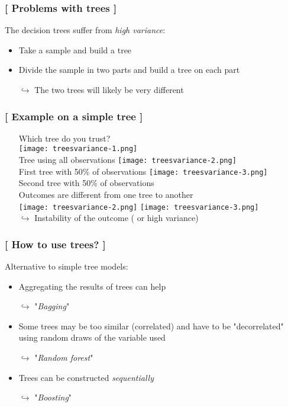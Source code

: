 \documentclass[xcolor=x11names,compress]{beamer}
\renewcommand{\(}{\begin{columns}}
\renewcommand{\)}{\end{columns}}
\newcommand{\<}[1]{\begin{column}{#1}}
\renewcommand{\>}{\end{column}}
\begin{document}
\begin{frame}
\frametitle{\textcolor{brique}{[ Problems with  trees  ]}}
The decision trees  suffer from \textit{high variance}:
\pause
\begin{itemize}[<+->]
    \item Take a sample and build a tree
    \item Divide the sample in two parts and build a tree on each part
    \item[$\hookrightarrow$] The two trees will likely be very different
\end{itemize}
\end{frame}

\begin{frame} %
\frametitle{\textcolor{brique}{[ Example on a simple tree ]}}
\pause
\begin{itemize}
\item[] Which tree do you trust? \\
    {\texttt{[image: treesvariance-1.png]} \\ }
    {Tree using all observations}
    {\texttt{[image: treesvariance-2.png]} \\ }
    {First tree with 50\% of observations}
    {\texttt{[image: treesvariance-3.png]} \\ }
    {Second tree with 50\% of observations}
    { $\;$ \\}
    {Outcomes are different from one tree to another\\ }
    {\texttt{[image: treesvariance-2.png]} \texttt{[image: treesvariance-3.png]} \\ }
    {$\hookrightarrow$ Instability of the outcome ( or high variance)}
\end{itemize}
\end{frame}

\begin{frame}
\frametitle{\textcolor{brique}{[ How to use trees? ]}}
Alternative to simple tree models:
\pause
\begin{itemize}[<+->]
    \item Aggregating the results of trees can help
    \item[$\hookrightarrow$]  "\emph{Bagging}"
    \item Some trees may be too similar (correlated) and have to be "decorrelated" using random draws of the variable used
    \item[$\hookrightarrow$]  "\emph{Random forest}"
    \item Trees can be constructed \textit{sequentially}
    \item[$\hookrightarrow$] "\emph{Boosting}"
\end{itemize}
\end{frame}
\end{document}
